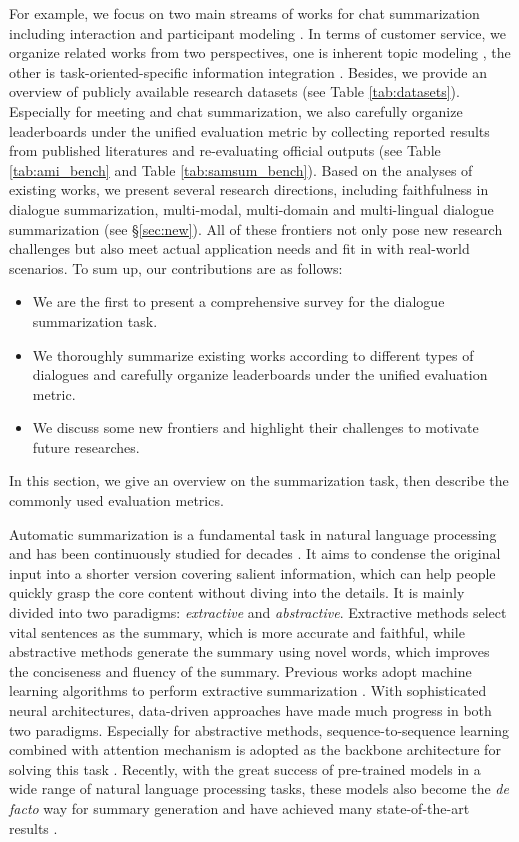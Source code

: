 For example, we focus on two main streams of works for chat summarization including interaction and participant modeling .
In terms of customer service, we organize related works from two perspectives, one is inherent topic modeling , the other is task-oriented-specific information integration .
Besides, we provide an overview of publicly available research datasets (see Table \ref{tab:datasets}). Especially for meeting and chat summarization, we also carefully organize leaderboards under the unified evaluation metric by collecting reported results from published literatures and re-evaluating official outputs (see Table \ref{tab:ami_bench} and Table \ref{tab:samsum_bench}).
Based on the analyses of existing works, we present several research directions, including faithfulness in dialogue summarization, multi-modal, multi-domain and multi-lingual dialogue summarization (see \S\ref{sec:new}). All of these frontiers not only pose new research challenges but also meet actual application needs and fit in with real-world scenarios.
To sum up, our contributions are as follows: 
\begin{itemize}
    \item We are the first to present a comprehensive survey for the dialogue summarization task.
    \item We thoroughly summarize existing works according to different types of dialogues and carefully organize leaderboards under the unified evaluation metric.
    \item We discuss some new frontiers and highlight their challenges to motivate future researches.
\end{itemize}

\label{sec:bg}
In this section, we give an overview on the summarization task, then describe the commonly used evaluation metrics.

Automatic summarization is a fundamental task in natural language processing and has been continuously
studied for decades .
It aims to condense the original input into a shorter version covering salient information, which can help people quickly grasp the core content without diving into the details. 
It is mainly divided into two paradigms: \textit{extractive} and \textit{abstractive}. 
Extractive methods select vital sentences as the summary, which is more accurate and faithful, while abstractive methods generate the summary using novel words, which improves the conciseness and fluency of the summary. 
Previous works adopt machine learning algorithms to perform extractive summarization . 
With sophisticated neural architectures, data-driven approaches have made much progress in both two paradigms. 
Especially for abstractive methods, sequence-to-sequence learning combined with attention mechanism is adopted as the backbone architecture for solving this task .
Recently, with the great success of pre-trained models in a wide range of natural language processing tasks, these models also become the {\it de facto} way for summary generation and have achieved many state-of-the-art results .

